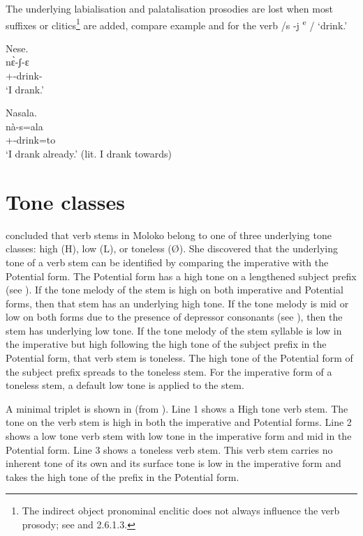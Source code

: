 The underlying labialisation and palatalisation prosodies are lost when most suffixes or clitics\footnote{The indirect object pronominal enclitic does not always influence the verb prosody; see  and 2.6.1.3.} are added, compare example  and  for the verb /s -j \textsuperscript{e} / ‘drink.’  

\ea \label{ex:6:17}
Nese.\\
\gll  n\`ɛ-ʃ{}-ɛ\\
      {\oneS}+{\PFV}-drink-{\CL}\\
\glt  ‘I drank.’
\z

\ea \label{ex:6:18}
Nasala.\\
\gll  nà-s=ala\\
      {\oneS}+{\PFV}-drink=to\\
\glt  ‘I drank already.’ (lit. I drank towards)
\z
{}
\section{Tone classes}\label{sec:6.7}
\hypertarget{RefHeading1212021525720847}{}
\citet{Bow1997c} concluded that verb stems in Moloko belong to one of three underlying tone classes: high (H), low (L), or toneless (Ø). She discovered that the underlying tone of a verb stem can be identified by comparing the {\twoS} imperative with the Potential form. The Potential form has a high tone on a lengthened subject prefix (see ). If the tone melody of the stem is high on both imperative and Potential forms, then that stem has an underlying high tone. If the tone melody is mid or low on both forms due to the presence of depressor consonants (see ), then the stem has underlying low tone.  If the tone melody of the stem syllable is low in the imperative but high following the high tone of the subject prefix in the Potential form, that verb stem is toneless. The high tone of the Potential form of the subject prefix spreads to the toneless stem. For the imperative form of a toneless stem, a default low tone is applied to the stem.  

A minimal triplet is shown in  (from \citealt{FriesenMamalis2008}). Line 1 shows a High tone verb stem. The tone on the verb stem is high in both the imperative and Potential forms. Line 2 shows a low tone verb stem with low tone in the imperative form and mid in the Potential form. Line 3 shows a toneless verb stem. This verb stem carries no inherent tone of its own and its surface tone is low in the imperative form and takes the high tone of the prefix in the Potential form. 

